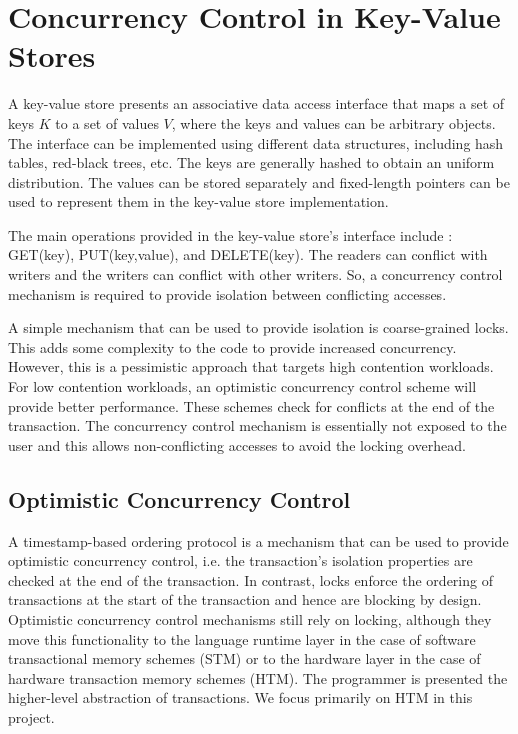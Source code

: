 \section{Concurrency Control in Key-Value Stores} \label{sec:tm}

A key-value store presents an associative data access interface that maps a set of keys $K$ to a set of values $V$, where the keys and values can be arbitrary objects. The interface can be implemented using different data structures, including hash tables, red-black trees, etc. The keys are generally hashed to obtain an uniform distribution. The values can be stored separately and fixed-length pointers can be used to represent them in the key-value store implementation.  

The main operations provided in the key-value store's interface include : \textsc{GET}(key), \textsc{PUT}(key,value), and \textsc{DELETE}(key). The readers can conflict with writers and the writers can conflict with other writers. So, a concurrency control mechanism is required to provide isolation between conflicting accesses. 

A simple mechanism that can be used to provide isolation is coarse-grained locks. This adds some complexity to the code to provide increased concurrency. However, this is a pessimistic approach that targets high contention workloads. For low contention workloads, an optimistic concurrency control scheme will provide better performance. These schemes check for conflicts at the end of the transaction. The concurrency control mechanism is essentially not exposed to the user and this allows non-conflicting accesses to avoid the locking overhead.

\subsection{Optimistic Concurrency Control}

A timestamp-based ordering protocol is a mechanism that can be used to provide optimistic concurrency control, i.e. the transaction's isolation properties are checked at the end of the transaction. In contrast, locks enforce the ordering of transactions at the start of the transaction and hence are blocking by design. Optimistic concurrency control mechanisms still rely on locking, although they move this functionality to the language runtime layer in the case of software transactional memory schemes (STM) or to the hardware layer in the case of hardware transaction memory schemes (HTM). The programmer is presented the higher-level abstraction of transactions. We focus primarily on HTM in this project.

